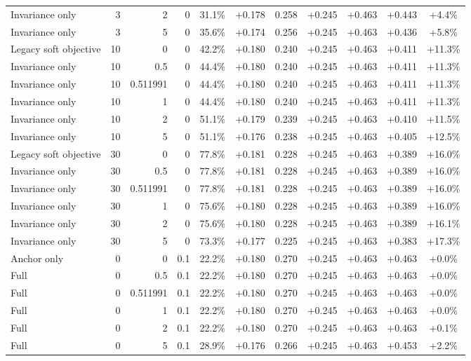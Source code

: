 \begin{table}[htbp]
\begin{tabular}{lrrrccccccc}
Invariance only & 3 & 2 & 0 & 31.1\% & +0.178 & 0.258 & +0.245 & +0.463 & +0.443 & +4.4\% \\
Invariance only & 3 & 5 & 0 & 35.6\% & +0.174 & 0.256 & +0.245 & +0.463 & +0.436 & +5.8\% \\
Legacy soft objective & 10 & 0 & 0 & 42.2\% & +0.180 & 0.240 & +0.245 & +0.463 & +0.411 & +11.3\% \\
Invariance only & 10 & 0.5 & 0 & 44.4\% & +0.180 & 0.240 & +0.245 & +0.463 & +0.411 & +11.3\% \\
Invariance only & 10 & 0.511991 & 0 & 44.4\% & +0.180 & 0.240 & +0.245 & +0.463 & +0.411 & +11.3\% \\
Invariance only & 10 & 1 & 0 & 44.4\% & +0.180 & 0.240 & +0.245 & +0.463 & +0.411 & +11.3\% \\
Invariance only & 10 & 2 & 0 & 51.1\% & +0.179 & 0.239 & +0.245 & +0.463 & +0.410 & +11.5\% \\
Invariance only & 10 & 5 & 0 & 51.1\% & +0.176 & 0.238 & +0.245 & +0.463 & +0.405 & +12.5\% \\
Legacy soft objective & 30 & 0 & 0 & 77.8\% & +0.181 & 0.228 & +0.245 & +0.463 & +0.389 & +16.0\% \\
Invariance only & 30 & 0.5 & 0 & 77.8\% & +0.181 & 0.228 & +0.245 & +0.463 & +0.389 & +16.0\% \\
Invariance only & 30 & 0.511991 & 0 & 77.8\% & +0.181 & 0.228 & +0.245 & +0.463 & +0.389 & +16.0\% \\
Invariance only & 30 & 1 & 0 & 75.6\% & +0.180 & 0.228 & +0.245 & +0.463 & +0.389 & +16.0\% \\
Invariance only & 30 & 2 & 0 & 75.6\% & +0.180 & 0.228 & +0.245 & +0.463 & +0.389 & +16.1\% \\
Invariance only & 30 & 5 & 0 & 73.3\% & +0.177 & 0.225 & +0.245 & +0.463 & +0.383 & +17.3\% \\
Anchor only & 0 & 0 & 0.1 & 22.2\% & +0.180 & 0.270 & +0.245 & +0.463 & +0.463 & +0.0\% \\
Full & 0 & 0.5 & 0.1 & 22.2\% & +0.180 & 0.270 & +0.245 & +0.463 & +0.463 & +0.0\% \\
Full & 0 & 0.511991 & 0.1 & 22.2\% & +0.180 & 0.270 & +0.245 & +0.463 & +0.463 & +0.0\% \\
Full & 0 & 1 & 0.1 & 22.2\% & +0.180 & 0.270 & +0.245 & +0.463 & +0.463 & +0.0\% \\
Full & 0 & 2 & 0.1 & 22.2\% & +0.180 & 0.270 & +0.245 & +0.463 & +0.463 & +0.1\% \\
Full & 0 & 5 & 0.1 & 28.9\% & +0.176 & 0.266 & +0.245 & +0.463 & +0.453 & +2.2\% \\

\end{tabular}
\end{table}
